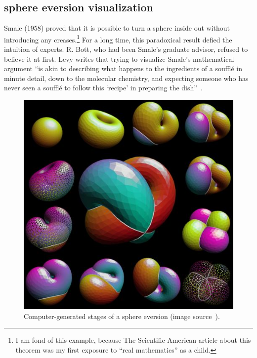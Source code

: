 \documentclass{llncs}
\begin{document}
%



\subsection{sphere eversion visualization}


Smale (1958) proved that it is possible to turn a sphere inside out
without introducing any creases.\footnote{I am fond of this example,
because The Scientific American
  article \cite{Phi66} about this theorem was my first exposure to ``real
  mathematics'' as a child.}  For a long time, this paradoxical result
defied the intuition of experts.  R. Bott, who had been Smale's
graduate advisor, refused to believe it at first.  Levy writes that
trying to visualize Smale's mathematical argument ``is akin to
describing what happens to the ingredients of a souffl\'e in minute
detail, down to the molecular chemistry, and expecting someone who has
never seen a souffl\'e to follow this `recipe' in preparing the
dish''~\cite{Le95}.

\begin{figure}[h!]
  \centering
\includegraphics[scale=0.5]{bivtile.jpeg}
\caption{Computer-generated stages of a sphere eversion (image
  source~\cite{opti}).}
\label{fig:eversion}
\end{figure}
\end{document}
